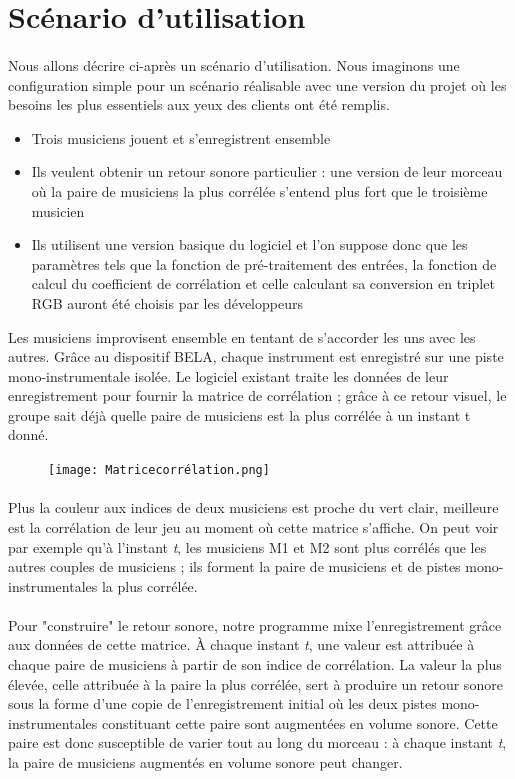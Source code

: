 \documentclass{article}
\begin{document}
\section{Scénario d'utilisation}
\paragraph{}
Nous allons décrire ci-après un scénario d'utilisation. Nous imaginons une
configuration simple pour un scénario réalisable avec une version du projet où
les besoins les plus essentiels aux yeux des clients ont été remplis.
\begin{itemize}
	\item Trois musiciens jouent et s'enregistrent ensemble
	\item Ils veulent obtenir un retour sonore particulier : une version de leur
	      morceau où la paire de musiciens la plus corrélée s'entend plus fort que le
	      troisième musicien
	\item Ils utilisent une version basique du logiciel et l'on suppose donc que
	      les paramètres tels que la fonction de pré-traitement des entrées, la fonction
	      de calcul du coefficient de corrélation et celle calculant sa conversion en
	      triplet RGB auront été choisis par les développeurs
\end{itemize}
Les musiciens improvisent ensemble en tentant de s'accorder les uns avec les
autres. Grâce au dispositif BELA, chaque instrument est enregistré sur une
piste mono-instrumentale isolée. Le logiciel existant traite les données de
leur enregistrement pour fournir la matrice de corrélation ; grâce à ce retour
visuel, le groupe sait déjà quelle paire de musiciens est la plus corrélée à
un instant t donné.
\begin{figure}
	\centering
	\texttt{[image: Matricecorrélation.png]}
\end{figure}
\paragraph{}
Plus la couleur aux indices de deux musiciens est proche du vert clair,
meilleure est la corrélation de leur jeu au moment où cette matrice s'affiche.
On peut voir par exemple qu'à l'instant \textit{t}, les musiciens M1 et M2
sont plus corrélés que les autres couples de musiciens ; ils forment la paire
de musiciens et de pistes mono-instrumentales la plus corrélée.
\paragraph{}
Pour "construire" le retour sonore, notre programme mixe l'enregistrement
grâce aux données de cette matrice. À chaque instant \textit{t}, une valeur
est attribuée à chaque paire de musiciens à partir de son indice de
corrélation. La valeur la plus élevée, celle attribuée à la paire la plus
corrélée, sert à produire un retour sonore sous la forme d'une copie de
l'enregistrement initial où les deux pistes mono-instrumentales constituant
cette paire sont augmentées en volume sonore. Cette paire est donc susceptible
de varier tout au long du morceau : à chaque instant \textit{t}, la paire de
musiciens augmentés en volume sonore peut changer.
\end{document}
